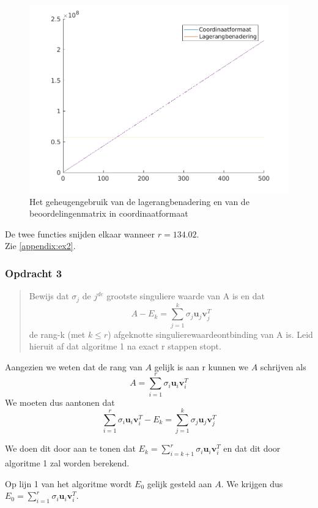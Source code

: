 \documentclass[11pt, a4paper, titlepage, openright]{article}
\begin{document}
	\begin{figure}[H]
		\centering
		\includegraphics[width=0.7\linewidth]{../ex2}
		\caption{Het geheugengebruik van de lagerangbenadering en van de beoordelingenmatrix in coordinaatformaat}
		\label{fig:ex2}
	\end{figure}

    De twee functies snijden elkaar wanneer \( r = 134.02 \). \\
    Zie \ref{appendix:ex2}. \\

	\subsubsection{Opdracht 3}
    \begin{quote}
        Bewijs dat \(\sigma_j\) de \(j^{de}\) grootste singuliere waarde van A is en dat
        \[ A - E_k = \sum\limits_{j=1}^{k} \sigma_j \textbf{u}_j \textbf{v}_j^T \]
        de rang-k (met \( k \leq r \)) afgeknotte singulierewaardeontbinding van A is.
        Leid hieruit af dat algoritme 1 na exact r stappen stopt.
    \end{quote}

    Aangezien we weten dat de rang van \(A\) gelijk is aan r kunnen we \(A\) schrijven als
    \[ A =  \sum\limits_{i=1}^{r} \sigma_i \textbf{u}_i \textbf{v}_i^T \]
    We moeten dus aantonen dat
    \[ \sum\limits_{i=1}^{r} \sigma_i \textbf{u}_i \textbf{v}_i^T - E_k
       = \sum\limits_{j=1}^{k} \sigma_j \textbf{u}_j \textbf{v}_j^T \]

    We doen dit door aan te tonen dat \( E_k = \sum\limits_{i=k+1}^{r} \sigma_i \textbf{u}_i \textbf{v}_i^T \) en dat
    dit door algoritme 1 zal worden berekend. \\
    \newpage

    Op lijn 1 van het algoritme wordt \( E_0 \) gelijk gesteld aan \(A\). We krijgen dus \( E_0 = \sum\limits_{i=1}^{r} \sigma_i \textbf{u}_i \textbf{v}_i^T \).
    \bigskip
\end{document}
